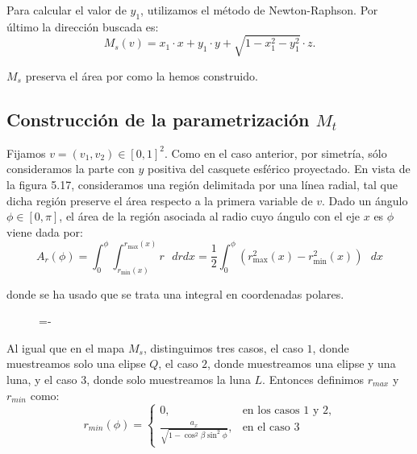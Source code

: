 Para calcular el valor de $y_1$, utilizamos el método de Newton-Raphson. Por último la dirección buscada es:
$$M_s(v) = x_1\cdot x + y_1\cdot y + \sqrt{1-x_1^2-y_1^2} \cdot z.$$

$M_s$ preserva el área por como la hemos construido.

\subsection{Construcción de la parametrización $M_t$}
Fijamos $v=(v_1,v_2)\in [0,1]^2$. Como en el caso anterior, por simetría, sólo consideramos la parte con $y$ positiva del casquete esférico proyectado. En vista de la figura 5.17, consideramos una región delimitada por una línea radial, tal que dicha región preserve el área respecto a la primera variable de $v$. Dado un ángulo $\phi\in [0,\pi]$, el área de la región asociada al radio cuyo ángulo con el eje $x$ es $\phi$ viene dada por:
$$A_r(\phi) = \int_0^{\phi}\int_{r_{\min}(x)}^{r_{\max}(x)} r \text{ }dr dx = \frac{1}{2}\int_0^{\phi}(r_{\max}^2(x)-r_{\min}^2(x))\text{ } dx$$

donde se ha usado que se trata una integral en coordenadas polares.

\begin{figure}[h]
  \lineskip=-\fboxrule
\end{figure}

 Al igual que en el mapa $M_s$, distinguimos tres casos, el caso $1$, donde muestreamos solo una elipse $Q$, el caso $2$, donde muestreamos una elipse y una luna, y el caso $3$, donde solo muestreamos la luna $L$. Entonces definimos $r_{max}$ y $r_{min}$ como:
\[ r_{min}(\phi) =
   \begin{cases}
      0, & \text{en los casos 1 y 2}, \\
      \frac{a_x}{\sqrt{1-\cos^2\beta\sin^2\phi}}, & \text{en el caso 3}
   \end{cases}
  \]

